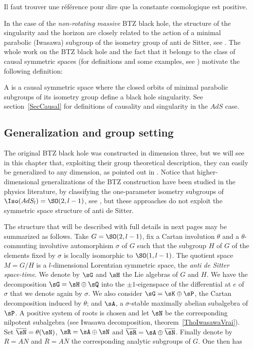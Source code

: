 \begin{probleme}
	Il faut trouver une référence pour dire que la constante cosmologique est positive.
\end{probleme}

In the case of the \emph{non-rotating massive} BTZ black hole, the structure of the singularity and the horizon are closely related to the action of a minimal parabolic (Iwasawa) subgroup of the isometry group of anti de Sitter, see \cite{BTZB_deux,Keio}. The whole work on the BTZ black hole and the fact that it belongs to the class of causal symmetric spaces (for definitions and some examples, see \cite{HilgertOlaf}) motivate the following definition:

\begin{definition}
	A  is a causal symmetric space where the closed orbits of minimal parabolic subgroups of its isometry group define a black hole singularity. See section~\ref{SecCausal} for definitions of causality and singularity in the $AdS$ case.
	\label{Def1}
\end{definition}

\subsection{Generalization and group setting}
\label{SubSecGEneBHGrop}


The original BTZ black hole was constructed in dimension three, but we will see in this chapter that, exploiting their group theoretical description, they can easily be generalized to any dimension, as pointed out in \cite{BDRS,lcTNAdS}.  Notice that higher-dimensional generalizations of the BTZ construction have been studied in the physics literature, by classifying the one-parameter isometry subgroups of $\Iso(AdS_l)=\SO(2,l-1)$, see \cite{Figueroa,AdSBH,Madden,BanadosIQxXuEh,Aminneborg,HolstPeldan}, but these approaches do not exploit the symmetric space structure of anti de Sitter.

The structure that will be described with full details in next pages may be summarized as follows. Take $G=\SO(2,l-1)$, fix a Cartan involution $\theta$ and a $\theta$-commuting involutive automorphism $\sigma$ of $G$ such that the subgroup $H$ of $G$ of the elements fixed by $\sigma$ is locally isomorphic to $\SO(1,l-1)$. The quotient space $M=G/H$ is a $l$-dimensional Lorentzian symmetric space, the {\sl anti de Sitter space-time}.  We denote by $\sG$ and $\sH$ the Lie algebras of $G$ and $H$. We have the decomposition $\sG=\sH\oplus\sQ$ into the $\pm 1$-eigenspace  of the differential at $e$ of $\sigma$ that we denote again by $\sigma$.  We also consider $\sG=\sK\oplus\sP$, the Cartan decomposition induced by $\theta$; and $\sA$, a $\sigma$-stable maximally abelian subalgebra of $\sP$. A positive system of roots is chosen  and let $\sN$ be the corresponding nilpotent subalgebra (see Iwasawa decomposition, theorem~\ref{ThoIwasawaVrai}).  Set  $\overline{\sN}=\theta(\sN)$, $\sR=\sA\oplus\sN$ and $\overline{\sR}=\sA\oplus\overline{\sN}$. Finally denote by $R=AN$ and $\overline{R}=A\overline{N}$ the corresponding analytic subgroups of $G$.  One then has

